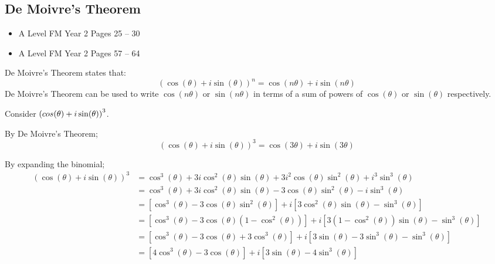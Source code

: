 \documentclass[11pt, a4paper]{article}
\begin{document}
\subsection{De Moivre's Theorem}
\begin{itemize}
\item A Level FM Year 2 \hspace{1cm} \phantom{AS /} Pages 25 -- 30
\item A Level FM Year 2 \hspace{1cm} \phantom{AS /} Pages 57 -- 64
\end{itemize} \par
De Moivre's Theorem states that:
\begin{equation*}
\left(\cos(\theta)+i\sin(\theta)\right)^{n}=\cos(n\theta)+i\sin(n\theta)
\end{equation*}
De Moivre's Theorem can be used to write $\cos(n\theta)$ or $\sin(n\theta)$ in terms of a sum of powers of $\cos(\theta)$ or $\sin(\theta)$ respectively.

Consider $\left(\\cos(\theta)+i\sin(\theta)\right)^{3}$. \newline \par
By De Moivre's Theorem;
\begin{equation*}
\left(\cos(\theta)+i\sin(\theta)\right)^{3}=\cos(3\theta)+i\sin(3\theta)
\end{equation*} \par
By expanding the binomial;
\scriptsize
\begin{align*}
\left(\cos(\theta)+i\sin(\theta)\right)^{3}&=\cos^{3}(\theta)+3i\cos^{2}(\theta)\sin(\theta)+3i^{2}\cos(\theta)\sin^{2}(\theta)+i^{3}\sin^{3}(\theta) \\
&=\cos^{3}(\theta)+3i\cos^{2}(\theta)\sin(\theta)-3\cos(\theta)\sin^{2}(\theta)-i\sin^{3}(\theta) \\
&=\left[ \cos^{3}(\theta)-3\cos(\theta)\sin^{2}(\theta) \right] + i\left[ 3\cos^{2}(\theta)\sin(\theta)-\sin^{3}(\theta) \right] \\
&=\left[ \cos^{3}(\theta)-3\cos(\theta)\left( 1-\cos^{2}(\theta) \right) \right] + i\left[ 3\left( 1-\cos^{2}(\theta) \right)\sin(\theta)-\sin^{3}(\theta) \right] \\
&=\left[ \cos^{3}(\theta)-3\cos(\theta)+3\cos^{3}(\theta) \right] + i\left[ 3\sin(\theta)-3\sin^{3}(\theta)-\sin^{3}(\theta) \right] \\
&=\left[ 4\cos^{3}(\theta)-3\cos(\theta)\right] + i\left[ 3\sin(\theta)-4\sin^{3}(\theta)\right] \\
\end{align*}
\normalsize
\end{document}

